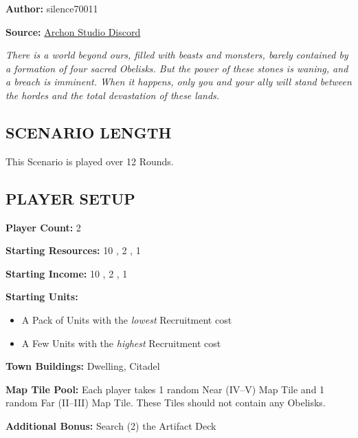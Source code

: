 
\begin{multicols}{2}

\textbf{Author:} silence70011

\textbf{Source:} \href{https://discord.com/channels/740870068178649108/1233112440322002964/1233112440322002964}{Archon Studio Discord}

\textit{There is a world beyond ours, filled with beasts and monsters, barely contained by a formation of four sacred Obelisks.
  But the power of these stones is waning, and a breach is imminent.
  When it happens, only you and your ally will stand between the hordes and the total devastation of these lands.
}

\subsection*{\MakeUppercase{Scenario Length}}

This Scenario is played over 12 Rounds.

\subsection*{\MakeUppercase{Player Setup}}

\textbf{Player Count:} 2

\textbf{Starting Resources:} 10 , 2 , 1 

\textbf{Starting Income:} 10 , 2 , 1 

\textbf{Starting Units:}
\begin{itemize}
  \item A Pack of  Units with the \textit{lowest} Recruitment cost
  \item A Few  Units with the \textit{highest} Recruitment cost
\end{itemize}

\textbf{Town Buildings:}  Dwelling, Citadel

\textbf{Map Tile Pool:} Each player takes 1 random Near (IV--V) Map Tile and 1 random Far (II--III) Map Tile. These Tiles should not contain any Obelisks.

\textbf{Additional Bonus:} Search (2) the Artifact Deck

\vspace*{\fill}\columnbreak


\end{multicols}
